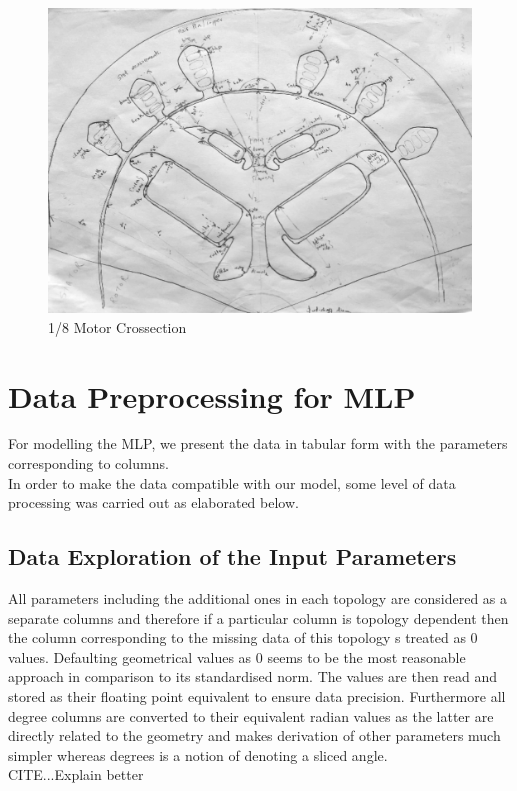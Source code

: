 \documentclass{report} %
\begin{document}
\begin{figure}[H]
    \centering
    \includegraphics[width=1\textwidth]{./ReportImages/EMCrosssectionFiltered.png} 
    \caption{1/8 Motor Crossection}
    \label{fig:1/8 Motor Crossection}
\end{figure}

\section{Data Preprocessing for \ac{MLP}}\label{sec:Data Preprocessing for MLP}
For modelling the \ac{MLP}, we present the data in tabular form with the parameters corresponding to columns. \\
In order to make the data compatible with our model, some level of data processing was carried out as elaborated below.

\subsection{Data Exploration of the Input Parameters}\label{subsec:Deep Dive into Input Parameters}
All parameters including the additional ones in each topology are considered as a separate columns and therefore if a particular column is topology dependent then the 
column corresponding to the missing data of this topology s treated as 0 values. Defaulting geometrical values as 0 seems to be the most reasonable approach in comparison 
to its standardised norm.
The values are then read and stored as their floating point equivalent to ensure data precision.
Furthermore all degree columns are converted to their equivalent radian values as the latter are directly related to the geometry and makes derivation of other 
parameters much simpler whereas degrees is a notion of denoting a sliced angle.\\ CITE...Explain better
\end{document}
